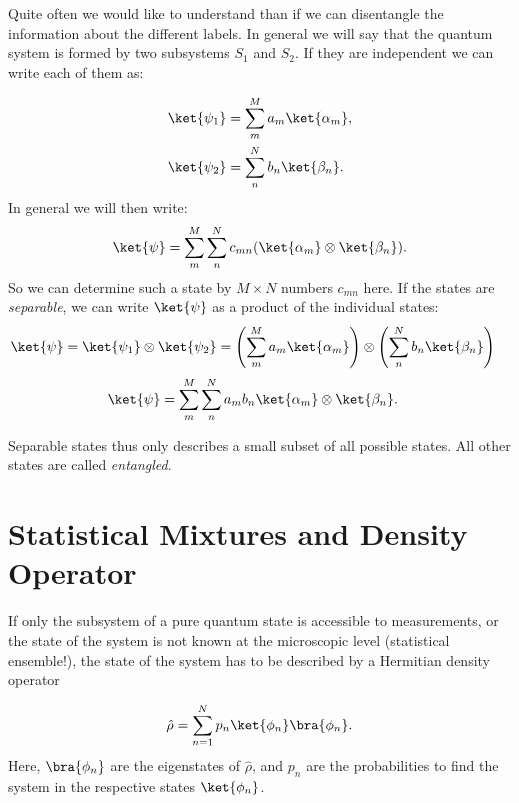  Quite often we would like to understand than if we can disentangle the information about the different labels. In general we will say that the quantum system is formed by two subsystems $S_1$ and $S_2$. If they are independent we can write each of them as:

\begin{align}
				\ket{\psi_1}&=\sum_m^M a_m \ket{\alpha_m},\\
				\ket{\psi_2}&=\sum_n^N b_n \ket{\beta_n}.
			
\end{align}
In general we will then write:
\begin{align}
\ket{\psi}=\sum_m^M \sum_n^N c_{mn}(\ket{\alpha_m}\otimes \ket{\beta_n}).
\end{align}
So we can determine such a state by $M \times N$ numbers $c_{mn}$ here.  If the states are \textit{separable}, we can write $\ket{\psi}$ as a product of the individual states:
\begin{align}
 \label{eq:psientangled} 
	\ket{\psi}	&=\ket{\psi_1}\otimes\ket{\psi_2}=\left(\sum_m^M a_m \ket{\alpha_m}\right) \otimes \left(\sum_n^N b_n \ket{\beta_n}\right)
\end{align}
\begin{align}
\ket{\psi}	&=\sum_m^M \sum_n^N a_m b_n \ket{\alpha_m} \otimes \ket{\beta_n}. \label{eq:psientangled3} 
\end{align}

Separable states thus only describes a small subset of all possible states. All other states are called \textit{entangled}.

\section{Statistical Mixtures and Density Operator}

If only the subsystem of a pure quantum state is accessible to measurements, or the state of the system is not known at the microscopic level (statistical ensemble!), the state of the system has to be described by a Hermitian density operator

\begin{align}
 \hat{\rho} = \sum_{n=1}^N p_n \ket{\phi_n}\bra{\phi_n}.
\end{align}
Here, $\bra{\phi_n}$ are the eigenstates of $\hat{\rho}$, and $p_n$ are the probabilities to find the system in the respective states $\ket{\phi_n}$.

